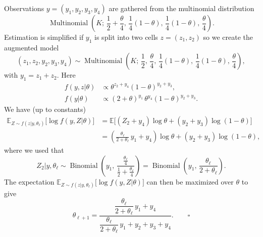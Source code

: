 \medskip
\noindent{}
\medskip

\begin{example}[Dempster et al.\ 1977]
  \label{ex:10.11}
  Observations $y = (y_1, y_2, y_3, y_4)$ are gathered from the multinomial distribution
  \[
    \operatorname{Multinomial}\!\left(K;\, \frac{1}{2}+\frac{\theta}{4},\, \frac{1}{4}(1-\theta),\,
    \frac{1}{4}(1-\theta),\, \frac{\theta}{4}\right).
  \]
  Estimation is simplified if $y_1$ is split into two cells $z = (z_1, z_2)$ so we create the
  augmented model
  \[
    (z_1, z_2, y_2, y_3, y_4) \sim \operatorname{Multinomial}\!\left(K;\,
    \frac{1}{2},\, \frac{\theta}{4},\, \frac{1}{4}(1-\theta),\, \frac{1}{4}(1-\theta),\,
    \frac{\theta}{4}\right),
  \]
  with $y_1 = z_1 + z_2$. Here
  \begin{align*}
    f(y, z|\theta) &\propto \theta^{z_2 + y_4}(1-\theta)^{y_2 + y_3}, \\
    f(y|\theta)    &\propto (2+\theta)^{y_1}\, \theta^{y_4}(1-\theta)^{y_2+y_3}.
  \end{align*}
  We have (up to constants)
  \begin{align*}
    \mathbb{E}_{Z \sim f(z|y,\theta_\ell)}\!\bigl[\log f(y, Z|\theta)\bigr]
      &= \mathbb{E}\bigl[(Z_2 + y_4)\log\theta + (y_2 + y_3)\log(1-\theta)\bigr] \\
      &= \left(\frac{\theta_\ell}{2+\theta_\ell}\, y_1 + y_4\right) \log\theta
         + (y_2 + y_3)\log(1-\theta),
  \end{align*}
  where we used that
  \[
    Z_2 | y, \theta_\ell \sim \operatorname{Binomial}\!\left(y_1,\,
    \frac{\tfrac{\theta_\ell}{4}}{\tfrac{1}{2} + \tfrac{\theta_\ell}{4}}\right)
    = \operatorname{Binomial}\!\left(y_1,\, \frac{\theta_\ell}{2 + \theta_\ell}\right).
  \]
  The expectation $\mathbb{E}_{Z \sim f(z|y,\theta_\ell)}\bigl[\log f(y, Z|\theta)\bigr]$ can then
  be maximized over $\theta$ to give
  \[
    \theta_{\ell+1} = \frac{\dfrac{\theta_\ell}{2+\theta_\ell}\,y_1 + y_4}{\dfrac{\theta_\ell}{2+\theta_\ell}\,y_1 + y_2 + y_3 + y_4}.\qquad\square
  \]
\end{example}

